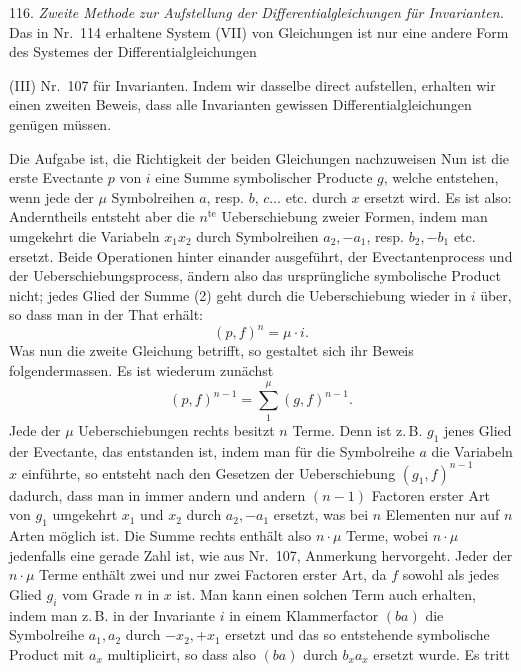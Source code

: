 116. \textit{Zweite Methode zur Aufstellung der Differentialgleichungen für Invarianten.} Das in Nr.~114 erhaltene System (VII) von Gleichungen ist nur eine andere Form des Systemes der Differentialgleichungen


(III) Nr.~107 für Invarianten. Indem wir dasselbe direct aufstellen, erhalten wir einen zweiten Beweis, dass alle Invarianten gewissen Differentialgleichungen genügen müssen.

Die Aufgabe ist, die Richtigkeit der beiden Gleichungen nachzuweisen
Nun ist die erste Evectante $p$ von $i$ eine Summe symbolischer Producte $g$, welche entstehen, wenn jede der $\mu$ Symbolreihen $a$, resp. $b$, $c \ldots$ etc. durch $x$ ersetzt wird. Es ist also:
Anderntheils entsteht aber die $n^{\text{te}}$ Ueberschiebung zweier Formen, indem man umgekehrt die Variabeln $x_1 x_2$ durch Symbolreihen $a_2, -a_1$, resp. $b_2, -b_1$ etc. ersetzt. Beide Operationen hinter einander ausgeführt, der Evectantenprocess und der Ueberschiebungsprocess, ändern also das ursprüngliche symbolische Product nicht; jedes Glied der Summe (2) geht durch die Ueberschiebung wieder in $i$ über, so dass man in der That erhält:
\[
(p,f)^n = \mu \cdot i.
\]
Was nun die zweite Gleichung betrifft, so gestaltet sich ihr Beweis folgendermassen. Es ist wiederum zunächst
\[
(p,f)^{n-1} = \sum_1^\mu (g,f)^{n-1}.
\]
Jede der $\mu$ Ueberschiebungen rechts besitzt $n$ Terme. Denn ist z.\,B. $g_1$ jenes Glied der Evectante, das entstanden ist, indem man für die Symbolreihe $a$ die Variabeln $x$ einführte, so entsteht nach den Gesetzen der Ueberschiebung $(g_1,f)^{n-1}$ dadurch, dass man in immer andern und andern $(n-1)$ Factoren erster Art von $g_1$ umgekehrt $x_1$ und $x_2$ durch $a_2, -a_1$ ersetzt, was bei $n$ Elementen nur auf $n$ Arten möglich ist. Die Summe rechts enthält also $n \cdot \mu$ Terme, wobei $n \cdot \mu$ jedenfalls eine gerade Zahl ist, wie aus Nr.~107, Anmerkung hervorgeht. Jeder der $n \cdot \mu$ Terme enthält zwei und nur zwei Factoren erster Art, da $f$ sowohl als jedes Glied $g_i$ vom Grade $n$ in $x$ ist. Man kann einen solchen Term auch erhalten, indem man z.\,B. in der Invariante $i$ in einem Klammerfactor $(ba)$ die Symbolreihe $a_1, a_2$ durch $-x_2, +x_1$ ersetzt und das so entstehende symbolische Product mit $a_x$ multiplicirt, so dass also $(ba)$ durch $b_x a_x$ ersetzt wurde. Es tritt


